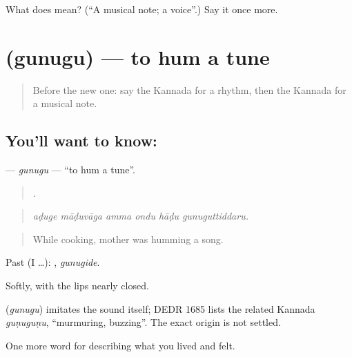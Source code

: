 \begin{tcolorbox}[breakable,colback=teal!4,colframe=teal!35!black,title={Before you move on}]
What does  mean? (\textquotedblleft{}A musical note; a voice\textquotedblright{}.) Say it once more.
\end{tcolorbox}
\section[\texorpdfstring{\kn{ಗುನುಗು} (gunugu)}{ಗುನುಗು (gunugu)}]{ (gunugu) — to hum a tune}

\label{lesson:KA-C534-gunugu}



\begin{quote}
Before the new one: say the Kannada for a rhythm, then the Kannada for a musical note.
\end{quote}

\subsection*{You'll want to know: }
\textbf{} — \emph{gunugu} — \textquotedblleft{}to hum a tune\textquotedblright{}.

\begin{quote}
     .
\end{quote}

\begin{quote}
\emph{aḍuge māḍuvāga amma ondu hāḍu gunuguttiddaru.}
\end{quote}

\begin{quote}
While cooking, mother was humming a song.
\end{quote}

Past (I …): , \emph{gunugide}.

Softly, with the lips nearly closed.

\begin{cousinweb}
\textbf{} (\emph{gunugu}) imitates the sound itself; DEDR 1685 lists the related Kannada \emph{guṇuguṇu}, \textquotedblleft{}murmuring, buzzing\textquotedblright{}. The exact origin is not settled.
\end{cousinweb}

\begin{grammarlens}[title={What you've built}]
One more word for describing what you lived and felt.
\end{grammarlens}

